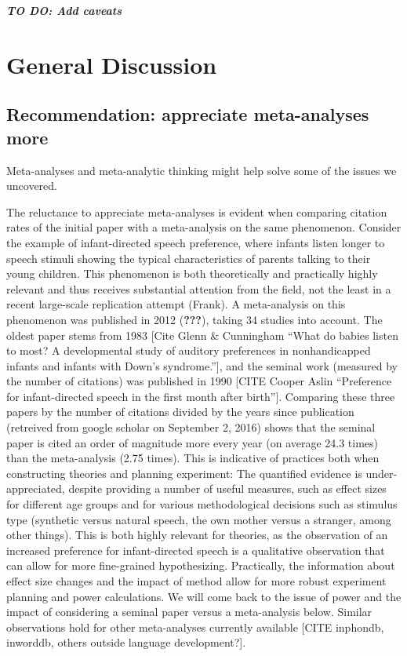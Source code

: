 \documentclass[english,floatsintext,man]{apa6}
\begin{document}
\textbf{\emph{TO DO: Add caveats}}

\section{General Discussion}\label{general-discussion}

\subsection{Recommendation: appreciate meta-analyses
more}\label{recommendation-appreciate-meta-analyses-more}

Meta-analyses and meta-analytic thinking might help solve some of the
issues we uncovered.

The reluctance to appreciate meta-analyses is evident when comparing
citation rates of the initial paper with a meta-analysis on the same
phenomenon. Consider the example of infant-directed speech preference,
where infants listen longer to speech stimuli showing the typical
characteristics of parents talking to their young children. This
phenomenon is both theoretically and practically highly relevant and
thus receives substantial attention from the field, not the least in a
recent large-scale replication attempt (Frank). A meta-analysis on this
phenomenon was published in 2012 ({\textbf{???}}), taking 34 studies
into account. The oldest paper stems from 1983 {[}Cite Glenn \&
Cunningham \enquote{What do babies listen to most? A developmental study
of auditory preferences in nonhandicapped infants and infants with
Down's syndrome.}{]}, and the seminal work (measured by the number of
citations) was published in 1990 {[}CITE Cooper Aslin
\enquote{Preference for infant-directed speech in the first month after
birth}{]}. Comparing these three papers by the number of citations
divided by the years since publication (retreived from google scholar on
September 2, 2016) shows that the seminal paper is cited an order of
magnitude more every year (on average 24.3 times) than the meta-analysis
(2.75 times). This is indicative of practices both when constructing
theories and planning experiment: The quantified evidence is
under-appreciated, despite providing a number of useful measures, such
as effect sizes for different age groups and for various methodological
decisions such as stimulus type (synthetic versus natural speech, the
own mother versus a stranger, among other things). This is both highly
relevant for theories, as the observation of an increased preference for
infant-directed speech is a qualitative observation that can allow for
more fine-grained hypothesizing. Practically, the information about
effect size changes and the impact of method allow for more robust
experiment planning and power calculations. We will come back to the
issue of power and the impact of considering a seminal paper versus a
meta-analysis below. Similar observations hold for other meta-analyses
currently available {[}CITE inphondb, inworddb, others outside language
development?{]}.
\end{document}
